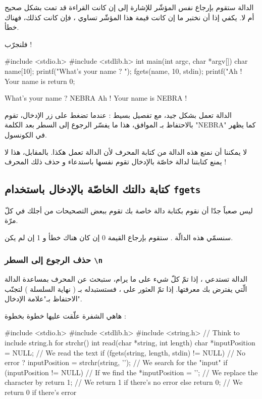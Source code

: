 الدالة ستقوم بإرجاع نفس المؤشّر
للإشارة إلى إن كانت القراءة قد تمت بشكل صحيح أم لا. يكفي إذا أن نختبر ما إن كانت قيمة هذا المؤشّر تساوي
،
فإن كانت كذلك، فهناك خطأ.

فلنجرّب !

\begin{Csource}
#include <stdio.h>
#include <stdlib.h>
int main(int argc, char *argv[])
{
	char name[10];
	printf("What's your name ? ");
	fgets(name, 10, stdin);
	printf("Ah ! Your name is %
	return 0;
}
\end{Csource}

\begin{Console}
What's your name ? NEBRA
Ah ! Your name is NEBRA
!
\end{Console}

الدالة تعمل بشكل جيد، مع تفصيل بسيط : عندما تضغط على زر الإدخال، تقوم
بالاحتفاظ بـ
الموافق، هذا ما يفسّر الرجوع إلى السطر بعد الكلمة
"\textenglish{NEBRA}"
كما يظهر في الكونسول.

لا يمكننا أن نمنع هذه الدالة من كتابة المحرف
لأن الدالة تعمل هكذا. بالمقابل، هذا لا يمنع كتابتنا لدالة خاصّة بالإدخال تقوم نفسها باستدعاء
و حذف ذلك المحرف !

\subsection{كتابة دالتك الخاصّة بالإدخال باستخدام \texttt{fgets}}

ليس صعباً جدّا أن نقوم بكتابة دالة خاصة بك تقوم ببعض التصحيحات من أجلك في كلّ مرّة.

سنسمّي هذه الدالّة
.
ستقوم بإرجاع القيمة 0 إن كان هناك خطأ و 1 إن لم يكن.

\subsubsection{حذف الرجوع إلى السطر \texttt{\textbackslash n}}

الدالة
تستدعي
،
إذا تمّ كلّ شيء على ما يرام، ستبحث عن المحرف
بمساعدة الدالة
الّتي يفترض بك معرفتها. إذا تمّ العثور على
،
فستستبدله بـ
( نهاية السلسلة ) لتجنّب الاحتفاظ بـ"علامة الإدخال".

هاهي الشفرة علّقت عليها خطوة بخطوة :

\begin{Csource}
#include <stdio.h>
#include <stdlib.h>
#include <string.h> // Think to include string.h for strchr()
int read(char *string, int length)
{
	char *inputPosition = NULL;
	// We read the text
	if (fgets(string, length, stdin) != NULL)  // No error ?
	{
    		inputPosition = strchr(string, '\n'); // We search for the "input"
    		if (inputPosition != NULL) // If we find the \n
    		{
        			*inputPosition = '\0'; // We replace the character by \0
    		}
    		return 1; // We return 1 if there's no error
	}
	else
	 {
    		return 0; // We return 0 if there's error
	 }
}
\end{Csource}

